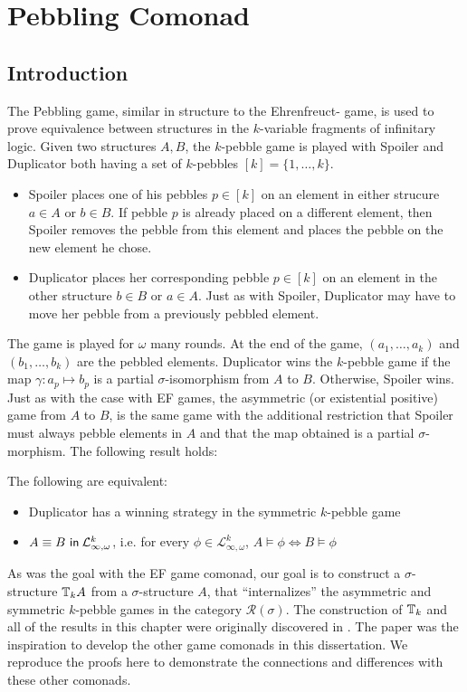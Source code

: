 \chapter{Pebbling Comonad}
\section{Introduction}
The Pebbling game, similar in structure to the Ehrenfreuct-{\Fraisse} game, is used to prove equivalence between structures in the $k$-variable fragments of infinitary logic. Given two structures $A,B$, the $k$-pebble game is played with Spoiler and Duplicator both having a set of $k$-pebbles $[k] = \{1,\dots,k\}$.  
\begin{itemize} 
\item Spoiler places one of his pebbles $p \in [k]$ on an element in either strucure $a \in A$ or $b \in B$. If pebble $p$ is already placed on a different element, then Spoiler removes the pebble from this element and places the pebble on the new element he chose.  
\item Duplicator places her corresponding pebble $p \in [k]$ on an element in the other structure $b \in B$ or $a \in A$. Just as with Spoiler, Duplicator may have to move her pebble from a previously pebbled element.
\end{itemize} 
The game is played for $\omega$ many rounds. At the end of the game, $(a_{1},\dots,a_{k})$ and $(b_{1},\dots,b_{k})$ are the pebbled elements. Duplicator wins the $k$-pebble game if the map $\gamma:a_{p} \longmapsto b_{p}$ is a partial $\sigma$-isomorphism from $A$ to $B$. Otherwise, Spoiler wins. Just as with the case with EF games, the asymmetric (or existential positive) game from $A$ to $B$, is the same game with the additional restriction that Spoiler must always pebble elements in $A$ and that the map obtained is a partial $\sigma$-morphism. The following result holds:
\begin{prop}
The following are equivalent:
\begin{itemize}
\item Duplicator has a winning strategy in the symmetric $k$-pebble game 
\item ${A \equiv B \ \mathsf{in}\: \mathcal{L}^{k}_{\infty,\omega}}$, i.e. for every $\phi \in \mathcal{L}^{k}_{\infty,\omega}$, $A \vDash \phi \Leftrightarrow B \vDash \phi$
\end{itemize}
\end{prop}
As was the goal with the EF game comonad, our goal is to construct a $\sigma$-structure ${\mathbb{T}_{k}A}$ from a $\sigma$-structure $A$, that ``internalizes'' the asymmetric and symmetric $k$-pebble games in the category $\mathcal{R}(\sigma)$. The construction of ${\mathbb{T}_{k}}$ and all of the results in this chapter were originally discovered in \cite{Abramsky2017}. The paper \cite{Abramsky2017} was the inspiration to develop the other game comonads in this dissertation. We reproduce the proofs here to demonstrate the connections and differences with these other comonads.  
